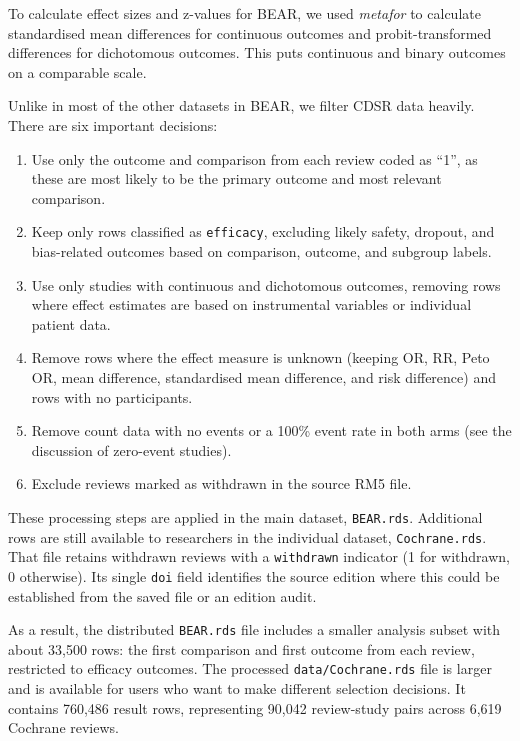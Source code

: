\documentclass[
  11pt,
]{article}
\providecommand{\tightlist}{%
  \setlength{\itemsep}{0pt}\setlength{\parskip}{0pt}}
\begin{document}
To calculate effect sizes and z-values for BEAR, we used \emph{metafor}
to calculate standardised mean differences for continuous outcomes and
probit-transformed differences for dichotomous outcomes. This puts
continuous and binary outcomes on a comparable scale.

Unlike in most of the other datasets in BEAR, we filter CDSR data
heavily. There are six important decisions:

\begin{enumerate}
\def\labelenumi{\arabic{enumi}.}
\tightlist
\item
  Use only the outcome and comparison from each review coded as ``1'',
  as these are most likely to be the primary outcome and most relevant
  comparison.
\item
  Keep only rows classified as \texttt{efficacy}, excluding likely
  safety, dropout, and bias-related outcomes based on comparison,
  outcome, and subgroup labels.
\item
  Use only studies with continuous and dichotomous outcomes, removing
  rows where effect estimates are based on instrumental variables or
  individual patient data.
\item
  Remove rows where the effect measure is unknown (keeping OR, RR, Peto
  OR, mean difference, standardised mean difference, and risk
  difference) and rows with no participants.
\item
  Remove count data with no events or a 100\% event rate in both arms
  (see the discussion of zero-event studies).
\item
  Exclude reviews marked as withdrawn in the source RM5 file.
\end{enumerate}

These processing steps are applied in the main dataset,
\texttt{BEAR.rds}. Additional rows are still available to researchers in
the individual dataset, \texttt{Cochrane.rds}. That file retains
withdrawn reviews with a \texttt{withdrawn} indicator (1 for withdrawn,
0 otherwise). Its single \texttt{doi} field identifies the source
edition where this could be established from the saved file or an
edition audit.

As a result, the distributed \texttt{BEAR.rds} file includes a smaller
analysis subset with about 33,500 rows: the first comparison and first
outcome from each review, restricted to efficacy outcomes. The processed
\texttt{data/Cochrane.rds} file is larger and is available for users who
want to make different selection decisions. It contains 760,486 result
rows, representing 90,042 review-study pairs across 6,619 Cochrane
reviews.
\end{document}
